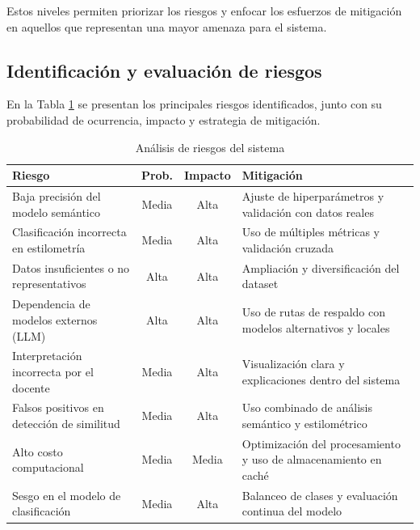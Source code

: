 Estos niveles permiten priorizar los riesgos y enfocar los esfuerzos de mitigación en aquellos que representan una mayor amenaza para el sistema.

\subsection{Identificación y evaluación de riesgos}

En la Tabla \ref{tab:riesgos} se presentan los principales riesgos identificados, junto con su probabilidad de ocurrencia, impacto y estrategia de mitigación.

\begin{table}[H]
	\centering
	\begin{tabularx}{\textwidth}{l c c >{\raggedright\arraybackslash}X}
		\toprule
		\textbf{Riesgo}                            & \textbf{Prob.} & \textbf{Impacto} & \textbf{Mitigación}                                             \\
		\midrule
		Baja precisión del modelo semántico        & Media          & Alta             & Ajuste de hiperparámetros y validación con datos reales         \\

		Clasificación incorrecta en estilometría   & Media          & Alta             & Uso de múltiples métricas y validación cruzada                  \\

		Datos insuficientes o no representativos   & Alta           & Alta             & Ampliación y diversificación del dataset                        \\

		Dependencia de modelos externos (LLM)      & Alta           & Alta             & Uso de rutas de respaldo con modelos alternativos y locales     \\

		Interpretación incorrecta por el docente   & Media          & Alta             & Visualización clara y explicaciones dentro del sistema          \\

		Falsos positivos en detección de similitud & Media          & Alta             & Uso combinado de análisis semántico y estilométrico             \\

		Alto costo computacional                   & Media          & Media            & Optimización del procesamiento y uso de almacenamiento en caché \\

		Sesgo en el modelo de clasificación        & Media          & Alta             & Balanceo de clases y evaluación continua del modelo             \\

		\bottomrule
	\end{tabularx}
	\caption{Análisis de riesgos del sistema}
	\label{tab:riesgos}
\end{table}

